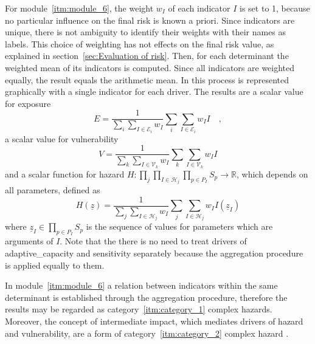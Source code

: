 For module~\ref{itm:module_6}, the weight $w_I$ of each \gls{indicator} $I$ is set to 1, because no particular influence on the final \gls{risk} is known a priori. Since \glspl{indicator} are unique, there is not ambiguity to identify their weights with their names as labels. This choice of weighting has not effects on the final \gls{risk} value, as explained in section~\ref{sec:Evaluation of risk}.
Then, for each \gls{determinant} the weighted mean of its \glspl{indicator} is computed. Since all \glspl{indicator} are weighted equally, the result equals the arithmetic mean. In \cite[51]{2017GIZRiskSupplement} this process is represented graphically with a single \gls{indicator} for each \gls{driver}.
The results are a scalar value for \gls{exposure}
\begin{equation}
  \label{eq:exposure_aggregated}
  E = \frac{1}{\sum_i \sum_{I \in \mathcal{E}_i} w_I} \sum_i \sum_{I \in \mathcal{E}_i} w_I I
  \quad ,
\end{equation}
a scalar value for \gls{vulnerability}
\begin{equation}
  \label{eq:vulnerability_aggregated}
  V = \frac{1}{\sum_k \sum_{I \in \mathcal{V}_k} w_I} \sum_k \sum_{I \in \mathcal{V}_k} w_I I
\end{equation}
and a scalar function for \gls{hazard} $H : \prod_j \prod_{I \in \mathcal{H}_j} \prod_{p \in P_I} S_p \to \mathbb{R}$, which depends on all parameters, defined as
\begin{equation}
  \label{eq:hazard_aggregated}
  H(\underline{z}) = \frac{1}{\sum_j \sum_{I \in \mathcal{H}_j} w_I} \sum_j \sum_{I \in \mathcal{H}_j} w_I I(\underline{z}_I)
\end{equation}
where $\underline{z}_I \in \prod_{p \in P_I} S_p$ is the sequence of values for parameters which are arguments of $I$.
Note that the there is no need to treat \glspl{driver} of \gls{adaptive_capacity} and \gls{sensitivity} separately because the aggregation procedure is applied equally to them.

In module~\ref{itm:module_6} a relation between \glspl{indicator} within the same \gls{determinant} is established through the aggregation procedure, therefore the results may be regarded as category~\ref{itm:category_1} complex \glspl{hazard}.
Moreover, the concept of intermediate impact, which mediates \glspl{driver} of hazard and \gls{vulnerability}, are a form of category~\ref{itm:category_2} complex \gls{hazard} \cite[33]{2017GIZRiskSupplement}.



